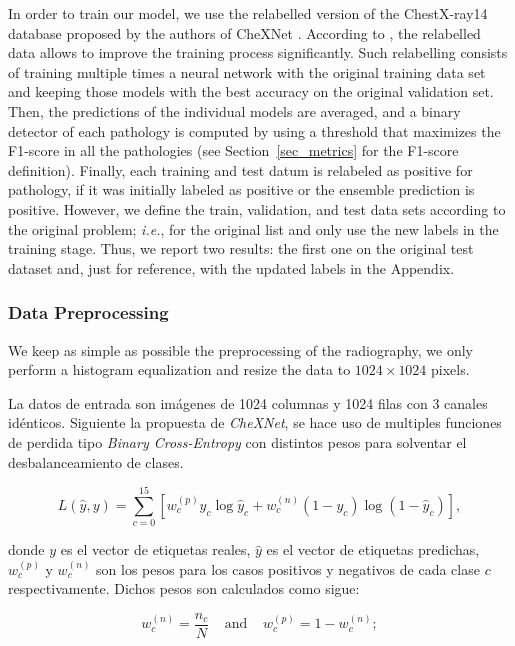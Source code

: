 {In order to train our model, we use the relabelled version of the ChestX-ray14 database proposed by
the authors of CheXNet \cite{rajpurkar2018deep}.  According to \cite{rajpurkar2018deep}, the
relabelled data allows to improve the training process significantly. Such relabelling consists of
training multiple times a  neural network with the original training data set and keeping those
models with the best accuracy on the original validation set. Then, the predictions of the individual
models are averaged, and a binary detector of each pathology is computed by using a threshold that
maximizes the F1-score in all the pathologies (see Section~\ref{sec_metrics} for the F1-score
definition). Finally, each training and test datum is relabeled as positive for pathology, if it was
initially labeled as positive or the ensemble prediction is positive. However,  we define the train,
validation, and test data sets according to the original problem; \emph{i.e.}, for the original list and
only use the new labels in the training stage. Thus, we report two results: the first one on the
original test dataset and, just for reference,  with the updated labels in the Appendix.

\subsubsection{Data Preprocessing}

We keep as simple as possible the preprocessing of the radiography, we only perform a histogram
equalization and resize the data to $1024 \times 1024$ pixels.

La datos de entrada son imágenes de 1024
columnas y 1024 filas con 3 canales idénticos. Siguiente la propuesta de \textit{CheXNet}, se hace uso
de multiples funciones de perdida tipo \textit{Binary Cross-Entropy} con distintos pesos
para solventar el desbalanceamiento de clases.

\begin{equation} \label{eq:loss}
    L(\hat y, y) = \sum_{c=0}^{15} \left[ w_c^{(p)} y_c \log \hat y_c  + w_c^{(n)}  (1-y_c) \log  (1- \hat y_c)  \right],
\end{equation}

donde $y$ es el vector de etiquetas reales, $\hat y$ es el vector de etiquetas predichas,
$w_c^{(p)}$ y $w_c^{(n)}$ son los pesos para los casos positivos y negativos de cada clase $c$
respectivamente. Dichos pesos son calculados como sigue:

\begin{equation}\label{eq:weights}
    w_c^{(n)} = \frac{n_c}{N} \;\;\;\;\text{and}\;\;\;\;   w_c^{(p)} = 1-  w_c^{(n)};
\end{equation}

}

